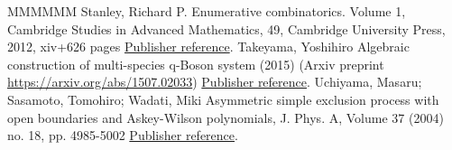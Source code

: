 \begin{thebibliography}{MMMMMM}
 Stanley, Richard P. Enumerative combinatorics. Volume 1, Cambridge Studies in Advanced Mathematics, 49, Cambridge University Press, 2012, xiv+626 pages \href{https://alco.centre-mersenne.org/articles/10.5802/alco.248/#stanley-ec1}{Publisher reference}.
 Takeyama, Yoshihiro Algebraic construction of multi-species q-Boson system (2015) (Arxiv preprint \url{https://arxiv.org/abs/1507.02033}) \href{https://alco.centre-mersenne.org/articles/10.5802/alco.248/#takeyama-2015}{Publisher reference}.
 Uchiyama, Masaru; Sasamoto, Tomohiro; Wadati, Miki Asymmetric simple exclusion process with open boundaries and Askey-Wilson polynomials, J. Phys. A, Volume 37 (2004) no. 18, pp. 4985-5002 \href{https://alco.centre-mersenne.org/articles/10.5802/alco.248/#USW}{Publisher reference}.
\end{thebibliography}
